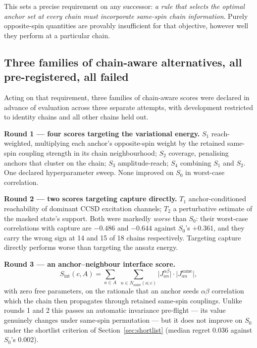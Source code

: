 \documentclass[11pt,a4paper]{article}
\begin{document}
This sets a precise requirement on any successor: \emph{a rule that selects
the optimal anchor set at every chain must incorporate same-spin chain
information}. Purely opposite-spin quantities are provably insufficient for
that objective, however well they perform at a particular chain.

\FloatBarrier
\subsection{Three families of chain-aware alternatives, all pre-registered, all failed}
\label{sec:chainaware}

Acting on that requirement, three families of chain-aware scores were
declared in advance of evaluation across three separate attempts, with
development restricted to identity chains and all other chains held out.

\textbf{Round 1 --- four scores targeting the variational energy.}
$S_1$ reach-weighted, multiplying each anchor's opposite-spin weight by the
retained same-spin coupling strength in its chain neighbourhood; $S_2$
coverage, penalising anchors that cluster on the chain; $S_3$
amplitude-reach; $S_4$ combining $S_1$ and $S_2$. One declared hyperparameter
sweep. None improved on $S_0$ in worst-case correlation.

\textbf{Round 2 --- two scores targeting capture directly.}
$T_1$ anchor-conditioned reachability of dominant CCSD excitation channels;
$T_2$ a perturbative estimate of the masked state's support. Both were
markedly \emph{worse} than $S_0$: their worst-case correlations with capture
are $-0.486$ and $-0.644$ against $S_0$'s $+0.361$, and they carry the wrong
sign at 14 and 15 of 18 chains respectively. Targeting capture directly
performs worse than targeting the ansatz energy.

\textbf{Round 3 --- an anchor--neighbour interface score.}
\begin{equation}
S_{\text{int}}(c, A) = \sum_{a \in A}\;
\sum_{n \in N_{\text{same}}(a;c)}
\bigl\lvert J^{\alpha\beta}_{an}\bigr\rvert \cdot
\bigl\lvert J^{\text{same}}_{an}\bigr\rvert,
\end{equation}
with zero free parameters, on the rationale that an anchor seeds
$\alpha\beta$ correlation which the chain then propagates through retained
same-spin couplings. Unlike rounds 1 and 2 this passes an automatic
invariance pre-flight --- its value genuinely changes under same-spin
permutation --- but it does not improve on $S_0$ under the shortlist
criterion of Section~\ref{sec:shortlist} (median regret 0.036 against
$S_0$'s 0.002).
\end{document}
